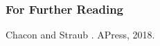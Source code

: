 \documentclass{beamer}
\begin{document}
\begin{frame}[allowframebreaks]
  \frametitle<presentation>{For Further Reading}
    
  \begin{thebibliography}{10}
    
  \beamertemplatebookbibitems

    Chacon and Straub
    .
    \newblock APress, 2018.

  \end{thebibliography}
\end{frame}
\end{document}
